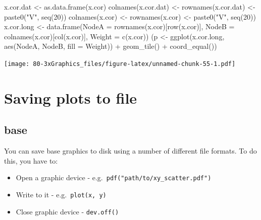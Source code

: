 \documentclass[
]{book}
\newenvironment{Shaded}{\begin{snugshade}}{\end{snugshade}}
\newcommand{\AttributeTok}[1]{\textcolor[rgb]{0.77,0.63,0.00}{#1}}
\newcommand{\DecValTok}[1]{\textcolor[rgb]{0.00,0.00,0.81}{#1}}
\newcommand{\FunctionTok}[1]{\textcolor[rgb]{0.00,0.00,0.00}{#1}}
\newcommand{\NormalTok}[1]{#1}
\newcommand{\OtherTok}[1]{\textcolor[rgb]{0.56,0.35,0.01}{#1}}
\newcommand{\SpecialCharTok}[1]{\textcolor[rgb]{0.00,0.00,0.00}{#1}}
\newcommand{\StringTok}[1]{\textcolor[rgb]{0.31,0.60,0.02}{#1}}
\providecommand{\tightlist}{%
  \setlength{\itemsep}{0pt}\setlength{\parskip}{0pt}}
\begin{document}
\begin{Shaded}
\begin{Highlighting}[]
\NormalTok{x.cor.dat }\OtherTok{\textless{}{-}} \FunctionTok{as.data.frame}\NormalTok{(x.cor)}
\FunctionTok{colnames}\NormalTok{(x.cor.dat) }\OtherTok{\textless{}{-}} \FunctionTok{rownames}\NormalTok{(x.cor.dat) }\OtherTok{\textless{}{-}} \FunctionTok{paste0}\NormalTok{(}\StringTok{"V"}\NormalTok{, }\FunctionTok{seq}\NormalTok{(}\DecValTok{20}\NormalTok{))}
\FunctionTok{colnames}\NormalTok{(x.cor) }\OtherTok{\textless{}{-}} \FunctionTok{rownames}\NormalTok{(x.cor) }\OtherTok{\textless{}{-}} \FunctionTok{paste0}\NormalTok{(}\StringTok{"V"}\NormalTok{, }\FunctionTok{seq}\NormalTok{(}\DecValTok{20}\NormalTok{))}
\NormalTok{x.cor.long }\OtherTok{\textless{}{-}} \FunctionTok{data.frame}\NormalTok{(}\AttributeTok{NodeA =} \FunctionTok{rownames}\NormalTok{(x.cor)[}\FunctionTok{row}\NormalTok{(x.cor)],}
                         \AttributeTok{NodeB =} \FunctionTok{colnames}\NormalTok{(x.cor)[}\FunctionTok{col}\NormalTok{(x.cor)],}
                         \AttributeTok{Weight =} \FunctionTok{c}\NormalTok{(x.cor))}
\NormalTok{(p }\OtherTok{\textless{}{-}} \FunctionTok{ggplot}\NormalTok{(x.cor.long, }\FunctionTok{aes}\NormalTok{(NodeA, NodeB, }\AttributeTok{fill =}\NormalTok{ Weight)) }\SpecialCharTok{+}
    \FunctionTok{geom\_tile}\NormalTok{() }\SpecialCharTok{+} \FunctionTok{coord\_equal}\NormalTok{())}
\end{Highlighting}
\end{Shaded}

\texttt{[image: 80-3xGraphics\_files/figure-latex/unnamed-chunk-55-1.pdf]}

\hypertarget{saving-plots-to-file}{%
\section{Saving plots to file}\label{saving-plots-to-file}}

\hypertarget{base-8}{%
\subsection{base}\label{base-8}}

You can save base graphics to disk using a number of different file formats. To do this, you have to:

\begin{itemize}
\tightlist
\item
  Open a graphic device - e.g.~\texttt{pdf("path/to/xy\_scatter.pdf")}
\item
  Write to it - e.g.~\texttt{plot(x,\ y)}
\item
  Close graphic device - \texttt{dev.off()}
\end{itemize}
\end{document}
